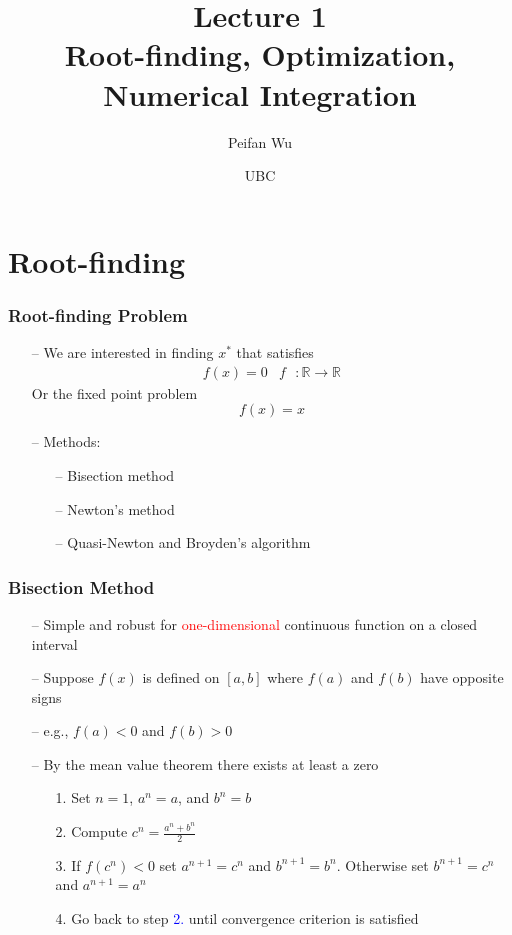 \documentclass[aspectratio=169, 11pt]{beamer}
\begin{document}
\title{Lecture 1 \\ Root-finding, Optimization, Numerical Integration}
\author[Wu]{Peifan Wu}
\date{UBC}

\begin{frame}
\titlepage
\end{frame}

\section{Root-finding}
\begin{frame}
\frametitle{Root-finding Problem}
  \begin{itemize}
    \item[--] We are interested in finding $x^{*}$ that satisfies
    \[
      \begin{array}{cc}
      f\left(x\right)=0 & f\text{ }:\text{}\mathbb{R}\to\mathbb{R}\end{array}
    \]
    Or the fixed point problem
    \[
      f(x)=x
    \]
    \bigskip
    \item[--] Methods:
    \begin{itemize}
      \item[--] Bisection method
      \item[--] Newton's method
      \item[--] Quasi-Newton and Broyden's algorithm
    \end{itemize}
  \end{itemize}
\end{frame}

\begin{frame}
\frametitle{Bisection Method}
  \begin{itemize}
    \item[--] Simple and robust for \textcolor{red}{one-dimensional} continuous function on a closed interval
    \bigskip
    \item[--] Suppose $f(x)$ is defined on $[a,b]$ where $f(a)$ and $f(b)$ have opposite signs
    \item[--] e.g., $f(a)<0$ and $f(b)>0$
    \bigskip
    \item[--] By the mean value theorem there exists at least a zero
    \begin{itemize}
      \medskip
      \item[1.] Set $n=1$, $a^{n}=a$, and $b^{n}=b$
      \medskip
      \item[2.] Compute $c^{n}=\frac{a^{n}+b^{n}}{2}$
      \medskip
      \item[3.] If $f(c^{n})<0$ set $a^{n+1}=c^{n}$ and $b^{n+1}=b^{n}$. Otherwise set $b^{n+1}=c^{n}$ and $a^{n+1}=a^{n}$
      \medskip
      \item[4.] Go back to step \textcolor{blue}{2.} until convergence criterion is satisfied
    \end{itemize}
  \end{itemize}
\end{frame}
\end{document}

